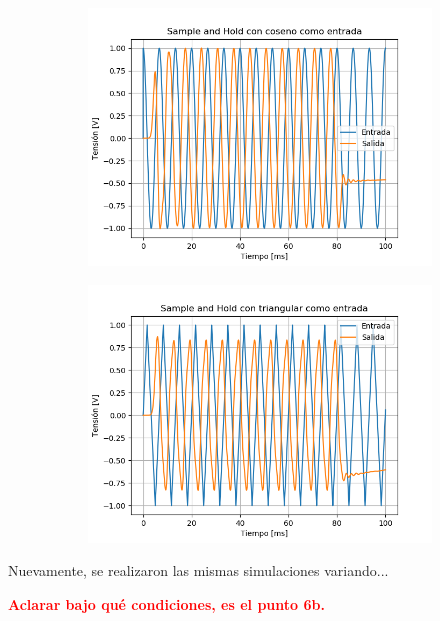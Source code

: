 \begin{figure}[H]
\centering
\begin{subfigure}{.49\textwidth}
	\centering
	\includegraphics[width=\textwidth]{ImagenesEjercicio6/SH - Cos.png}
\end{subfigure}
\begin{subfigure}{.49\textwidth}
	\centering
	\includegraphics[width=\textwidth]{ImagenesEjercicio6/SH - Tri.png}
\end{subfigure}
\end{figure} 

Nuevamente, se realizaron las mismas simulaciones variando...

\textcolor{red}{\textbf{Aclarar bajo qué condiciones, es el punto 6b.}}



